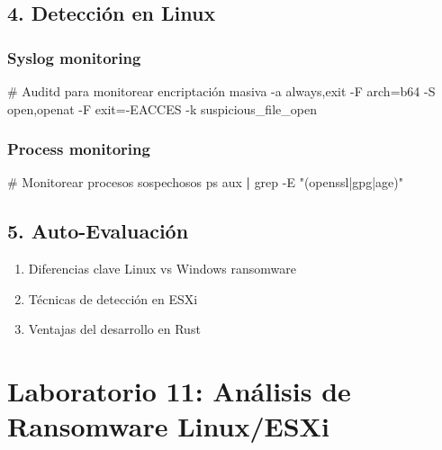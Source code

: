 \documentclass[
  letterpaper,
]{report}
\newenvironment{Shaded}{\begin{snugshade}}{\end{snugshade}}
\newcommand{\AttributeTok}[1]{\textcolor[rgb]{0.40,0.45,0.13}{#1}}
\newcommand{\CommentTok}[1]{\textcolor[rgb]{0.37,0.37,0.37}{#1}}
\newcommand{\ExtensionTok}[1]{\textcolor[rgb]{0.00,0.23,0.31}{#1}}
\newcommand{\FunctionTok}[1]{\textcolor[rgb]{0.28,0.35,0.67}{#1}}
\newcommand{\KeywordTok}[1]{\textcolor[rgb]{0.00,0.23,0.31}{\textbf{#1}}}
\newcommand{\NormalTok}[1]{\textcolor[rgb]{0.00,0.23,0.31}{#1}}
\newcommand{\StringTok}[1]{\textcolor[rgb]{0.13,0.47,0.30}{#1}}
\providecommand{\tightlist}{%
  \setlength{\itemsep}{0pt}\setlength{\parskip}{0pt}}
\begin{document}
\section{4. Detección en Linux}\label{detecciuxf3n-en-linux}

\subsection{Syslog monitoring}\label{syslog-monitoring}

\begin{Shaded}
\begin{Highlighting}[]
\CommentTok{\# Auditd para monitorear encriptación masiva}
\ExtensionTok{{-}a}\NormalTok{ always,exit }\AttributeTok{{-}F}\NormalTok{ arch=b64 }\AttributeTok{{-}S}\NormalTok{ open,openat }\AttributeTok{{-}F}\NormalTok{ exit={-}EACCES }\AttributeTok{{-}k}\NormalTok{ suspicious\_file\_open}
\end{Highlighting}
\end{Shaded}

\subsection{Process monitoring}\label{process-monitoring}

\begin{Shaded}
\begin{Highlighting}[]
\CommentTok{\# Monitorear procesos sospechosos}
\FunctionTok{ps}\NormalTok{ aux }\KeywordTok{|} \FunctionTok{grep} \AttributeTok{{-}E} \StringTok{"(openssl|gpg|age)"}
\end{Highlighting}
\end{Shaded}

\section{5. Auto-Evaluación}\label{auto-evaluaciuxf3n-10}

\begin{enumerate}
\def\labelenumi{\arabic{enumi}.}
\tightlist
\item
  Diferencias clave Linux vs Windows ransomware
\item
  Técnicas de detección en ESXi
\item
  Ventajas del desarrollo en Rust
\end{enumerate}

\chapter{Laboratorio 11: Análisis de Ransomware
Linux/ESXi}\label{laboratorio-11-anuxe1lisis-de-ransomware-linuxesxi}
\end{document}
